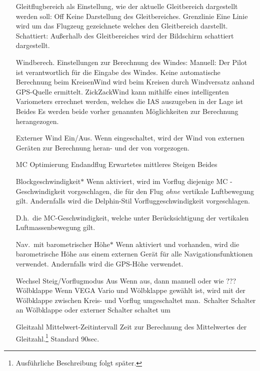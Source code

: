 \begin{enumerate}
\item[Gleitflugbereich als] Einstellung, wie der aktuelle Gleitbereich dargestellt werden soll: \textsf{Off} Keine Darstellung des Gleitbereiches. \textsf{Grenzlinie} Eine Linie wird um das Flugzeug gezeichnete welches den Gleitbereich darstellt. \textsf{Schattiert}: Außerhalb des Gleitbereiches wird der Bildschirm schattiert dargestellt.
\item[Windberech.]Einstellungen zur Berechnung des Windes: \textsf{ Manuell}: Der Pilot ist verantwortlich für die Eingabe des Windes. Keine automatische Berechnung \textsf{ beim Kreisen}Wind wird beim Kreisen durch Windversatz anhand GPS-Quelle ermittelt. \textsf{ZickZack}Wind kann  mithilfe eines intelligenten Variometers  errechnet werden, welches die IAS auszugeben in der Lage ist \textsf{Beides} Es werden beide vorher genannten Möglichkeiten zur Berechnung herangezogen.
\item[Externer Wind] Ein/Aus. Wenn eingeschaltet, wird der Wind von externen Geräten zur Berechnung heran- und der von \xc vorgezogen.
\item[MC Optimierung]\textsf{Endandflug} \textsf{Erwartetes mittleres Steigen} \textsf{Beides}
\item[Blockgeschwindigkeit$\ast$] Wenn aktiviert, wird im
Vorflug diejenige \textsf{MC} - Geschwindigkeit vorgeschlagen,  die für den Flug \textsl{ohne} vertikale Luftbewegung gilt. Andernfalls wird die \textsf{Delphin-Stil} Vorfluggeschwindigkeit vorgeschlagen.

    D.h.\ die \textsf{MC}-Geschwindigkeit, welche unter Berücksichtigung der vertikalen Luftmassenbewegung gilt.
\item[Nav.\ mit barometrischer Höhe$\ast$] Wenn aktiviert und vorhanden, wird die barometrische Höhe aus einem externen Gerät für alle Navigationsfunktionen verwendet.  Andernfalls wird die \textsf{GPS}-Höhe verwendet.
\item[Wechsel Steig/Vorflugmodus] \textsf{Aus} Wenn aus, dann manuell oder wie ???  \textsf{Wölbklappe} Wenn VEGA Vario und Wölbklappe gewählt ist, wird mit der Wölbklappe zwischen Kreis- und Vorflug umgeschaltet  \textsf{ man.\ Schalter} Schalter an Wölbklappe oder externer Schalter schaltet um\stop
\item[Gleitzahl Mittelwert-Zeitintervall]Zeit zur Berechnung des Mittelwertes der Gleitzahl.\footnote{Ausführliche  Beschreibung folgt später.} Standard 90sec.\
\end{enumerate}

